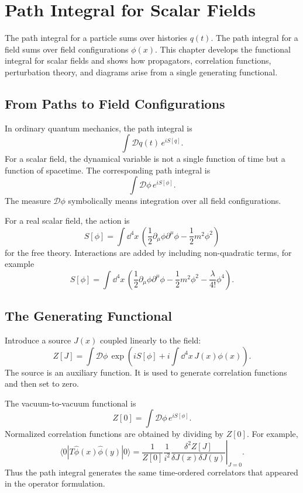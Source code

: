 \chapter{Path Integral for Scalar Fields}

\begin{remarkbox}
The path integral for a particle sums over histories \(q(t)\). The path integral
for a field sums over field configurations \(\phi(x)\). This chapter develops the
functional integral for scalar fields and shows how propagators, correlation
functions, perturbation theory, and diagrams arise from a single generating
functional.
\end{remarkbox}

\section{From Paths to Field Configurations}

In ordinary quantum mechanics, the path integral is
\[
    \int\mathcal{D}q(t)\,e^{iS[q]}.
\]
For a scalar field, the dynamical variable is not a single function of time but
a function of spacetime. The corresponding path integral is
\[
    \int\mathcal{D}\phi\,e^{iS[\phi]}.
\]
The measure \(\mathcal{D}\phi\) symbolically means integration over all field
configurations.

For a real scalar field, the action is
\[
    S[\phi]
    = \int\dd^4x\,
      \left(
          \frac{1}{2}\partial_\mu\phi\partial^\mu\phi
          -\frac{1}{2}m^2\phi^2
      \right)
\]
for the free theory. Interactions are added by including non-quadratic terms,
for example
\[
    S[\phi]
    = \int\dd^4x\,
      \left(
          \frac{1}{2}\partial_\mu\phi\partial^\mu\phi
          -\frac{1}{2}m^2\phi^2
          -\frac{\lambda}{4!}\phi^4
      \right).
\]

\section{The Generating Functional}

Introduce a source \(J(x)\) coupled linearly to the field:
\[
    Z[J]
    = \int\mathcal{D}\phi\,
      \exp\left(iS[\phi]+i\int\dd^4x\,J(x)\phi(x)\right).
\]
The source is an auxiliary function. It is used to generate correlation
functions and then set to zero.

The vacuum-to-vacuum functional is
\[
    Z[0]=\int\mathcal{D}\phi\,e^{iS[\phi]}.
\]
Normalized correlation functions are obtained by dividing by \(Z[0]\). For
example,
\[
    \langle0|T\hat\phi(x)\hat\phi(y)|0\rangle
    = \frac{1}{Z[0]}
      \left.\frac{1}{i^2}
      \frac{\delta^2 Z[J]}{\delta J(x)\delta J(y)}\right|_{J=0}.
\]
Thus the path integral generates the same time-ordered correlators that appeared
in the operator formulation.

